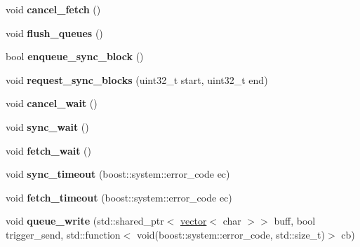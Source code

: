 \begin{DoxyCompactItemize}
\mbox{\label{classaacio_1_1connection_a212f64075223916c888984441fc6e739}} 
void {\bfseries cancel\+\_\+fetch} ()
\item 
\mbox{\label{classaacio_1_1connection_a79fcf6bce863a2386d5228328c61ab20}} 
void {\bfseries flush\+\_\+queues} ()
\item 
\mbox{\label{classaacio_1_1connection_a88b7102b93d9a48bc8ffdc6091a78aa0}} 
bool {\bfseries enqueue\+\_\+sync\+\_\+block} ()
\item 
\mbox{\label{classaacio_1_1connection_a623b239f0e1cf0e3629da5dd08dddebc}} 
void {\bfseries request\+\_\+sync\+\_\+blocks} (uint32\+\_\+t start, uint32\+\_\+t end)
\item 
\mbox{\label{classaacio_1_1connection_a5623cc220ba874d4a0f49b6f7b133e87}} 
void {\bfseries cancel\+\_\+wait} ()
\item 
\mbox{\label{classaacio_1_1connection_af75ea42ec694be94b29f3fb6f00366f6}} 
void {\bfseries sync\+\_\+wait} ()
\item 
\mbox{\label{classaacio_1_1connection_a5fcf466e750ec8e83a60779a9d4d5ae4}} 
void {\bfseries fetch\+\_\+wait} ()
\item 
\mbox{\label{classaacio_1_1connection_af7b4d7286f23c4646e97bc11850b1908}} 
void {\bfseries sync\+\_\+timeout} (boost\+::system\+::error\+\_\+code ec)
\item 
\mbox{\label{classaacio_1_1connection_a77a3df5370e3cd0aae124e2837c5a7fc}} 
void {\bfseries fetch\+\_\+timeout} (boost\+::system\+::error\+\_\+code ec)
\item 
\mbox{\label{classaacio_1_1connection_a172f093fca931b04f1fd768aca199695}} 
void {\bfseries queue\+\_\+write} (std\+::shared\+\_\+ptr$<$ \mbox{\hyperlink{classstd_1_1vector}{vector}}$<$ char $>$$>$ buff, bool trigger\+\_\+send, std\+::function$<$ void(boost\+::system\+::error\+\_\+code, std\+::size\+\_\+t)$>$ cb)
$$
\end{DoxyCompactItemize}
